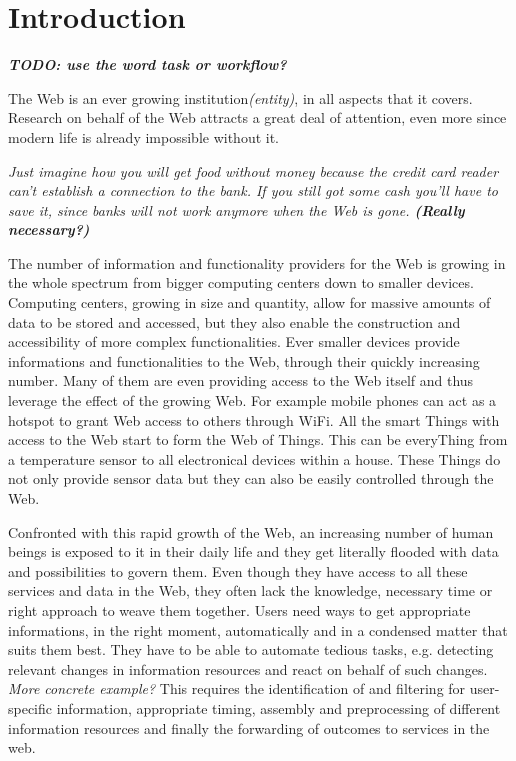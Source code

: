 
\chapter{Introduction}

\textit{\textbf{TODO: use the word task or workflow?}}

The Web is an ever growing institution\textit{(entity)}, in all aspects that it covers.
Research on behalf of the Web attracts a great deal of attention, even more since modern life is already impossible without it.

\textit{Just imagine how you will get food without money because the credit card reader can't establish a connection to the bank.
If you still got some cash you'll have to save it, since banks will not work anymore when the Web is gone. \textbf{(Really necessary?)}}

The number of information and functionality providers for the Web is growing in the whole spectrum from bigger computing centers down to smaller devices.
Computing centers, growing in size and quantity, allow for massive amounts of data to be stored and accessed, but they also enable the construction and accessibility of more complex functionalities.
Ever smaller devices provide informations and functionalities to the Web, through their quickly increasing number.
Many of them are even providing access to the Web itself and thus leverage the effect of the growing Web.
For example mobile phones can act as a hotspot to grant Web access to others through \textrm{WiFi}.
All the smart \textrm{Things} with access to the Web start to form the \textrm{Web of Things}.
This can be every\textrm{Thing} from a temperature sensor to all electronical devices within a house.
These \textrm{Things} do not only provide sensor data but they can also be easily controlled through the Web.

Confronted with this rapid growth of the Web, an increasing number of human beings is exposed to it in their daily life and they get literally flooded with data and possibilities to govern them.
Even though they have access to all these services and data in the Web, they often lack the knowledge, necessary time or right approach to weave them together.
Users need ways to get appropriate informations, in the right moment, automatically and in a condensed matter that suits them best.
They have to be able to automate tedious tasks, e.g. detecting relevant changes in information resources and react on behalf of such changes.
\textit{\small{More concrete example?}}
This requires the identification of and filtering for user-specific information, appropriate timing, assembly and preprocessing of different information resources and finally the forwarding of outcomes to services in the web. 

